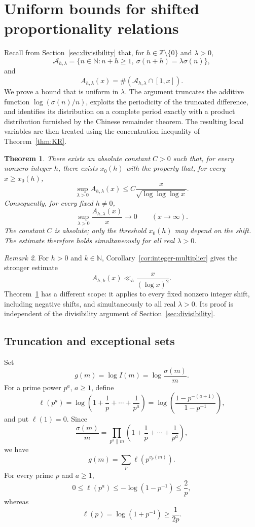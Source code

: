 \documentclass[11pt,reqno]{amsart}
\numberwithin{equation}{section}
\theoremstyle{plain}
\newtheorem{theorem}{Theorem}[section]
\theoremstyle{definition}
\theoremstyle{remark}
\newtheorem{remark}[theorem]{Remark}
\newcommand{\N}{\mathbb N}
\newcommand{\Z}{\mathbb Z}
\begin{document}
\section{Uniform bounds for shifted proportionality relations}
\label{sec:levelsets}

Recall from Section~\ref{sec:divisibility} that, for $h\in\Z\setminus\{0\}$ and $\lambda>0$,
\[
\mathcal A_{h,\lambda}
=
\{n\in\N:n+h\ge1,\ \sigma(n+h)=\lambda\sigma(n)\},
\]
and
\[
A_{h,\lambda}(x)=\#(\mathcal A_{h,\lambda}\cap[1,x]).
\]
We prove a bound that is uniform in $\lambda$. The argument
truncates the additive function $\log(\sigma(n)/n)$, exploits the
periodicity of the truncated difference, and identifies its distribution
on a complete period exactly with a product distribution furnished by
the Chinese remainder theorem. The resulting local variables are then
treated using the concentration inequality of Theorem~\ref{thm:KR}.

\begin{theorem}\label{thm:uniform-levelset}
There exists an absolute constant $C>0$ such that, for every nonzero integer $h$, there exists $x_0(h)$ with the property that,
for every $x\ge x_0(h)$,
\[
\sup_{\lambda>0}A_{h,\lambda}(x)
\le
C\frac{x}{\sqrt{\log\log\log x}}.
\]
Consequently, for every fixed $h\ne0$,
\[
\sup_{\lambda>0}\frac{A_{h,\lambda}(x)}x\longrightarrow0
\qquad(x\to\infty).
\]
The constant $C$ is absolute; only the threshold $x_0(h)$ may depend on the shift. The estimate therefore holds simultaneously for all real $\lambda>0$.
\end{theorem}

\begin{remark}\label{rem:scope-levelsets}
For $h>0$ and $k\in\N$, Corollary~\ref{cor:integer-multiplier} gives the stronger estimate
\[
A_{h,k}(x)\ll_h\frac{x}{(\log x)^2}.
\]
Theorem~\ref{thm:uniform-levelset} has a different scope: it applies to every fixed nonzero integer shift, including negative shifts, and simultaneously to all real $\lambda>0$. Its proof is independent of the divisibility argument of Section~\ref{sec:divisibility}.
\end{remark}

\subsection{Truncation and exceptional sets}

Set
\[
g(m)=\log I(m)=\log\frac{\sigma(m)}m.
\]
For a prime power $p^a$, $a\ge1$, define
\[
\ell(p^a)
=
\log\left(1+\frac1p+\cdots+\frac1{p^a}\right)
=
\log\left(\frac{1-p^{-(a+1)}}{1-p^{-1}}\right),
\]
and put $\ell(1)=0$. Since
\[
\frac{\sigma(m)}m
=
\prod_{p^a\parallel m}\left(1+\frac1p+\cdots+\frac1{p^a}\right),
\]
we have
\[
g(m)=\sum_p\ell\!\left(p^{v_p(m)}\right).
\]
For every prime $p$ and $a\ge1$,
\[
0\le\ell(p^a)\le-\log(1-p^{-1})\le\frac2p,
\]
whereas
\[
\ell(p)=\log(1+p^{-1})\ge\frac1{2p}.
\]
\end{document}
